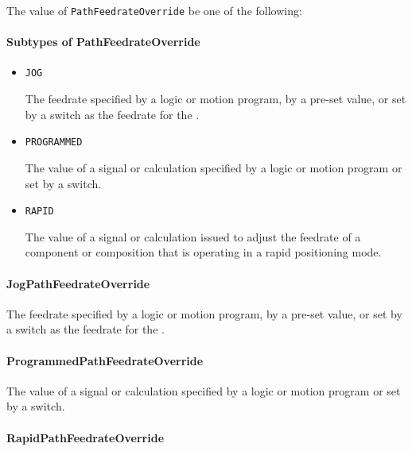 The value of \texttt{PathFeedrateOverride} \MUST be one of the following: 

\FloatBarrier

\paragraph{Subtypes of PathFeedrateOverride}\mbox{}
\label{sec:Subtypes of PathFeedrateOverride}

\begin{itemize}

\item \texttt{JOG}


The feedrate specified by a logic or motion program, by a pre-set value, or set by a switch as the feedrate for the . 

\item \texttt{PROGRAMMED}


The value of a signal or calculation specified by a logic or motion program or set by a switch.

\item \texttt{RAPID}


The value of a signal or calculation issued to adjust the feedrate of a component or composition that is operating in a rapid positioning mode.


\end{itemize}

\paragraph{JogPathFeedrateOverride}\mbox{}
\label{sec:JogPathFeedrateOverride}


The feedrate specified by a logic or motion program, by a pre-set value, or set by a switch as the feedrate for the . 


\paragraph{ProgrammedPathFeedrateOverride}\mbox{}
\label{sec:ProgrammedPathFeedrateOverride}


The value of a signal or calculation specified by a logic or motion program or set by a switch.


\paragraph{RapidPathFeedrateOverride}\mbox{}
\label{sec:RapidPathFeedrateOverride}


